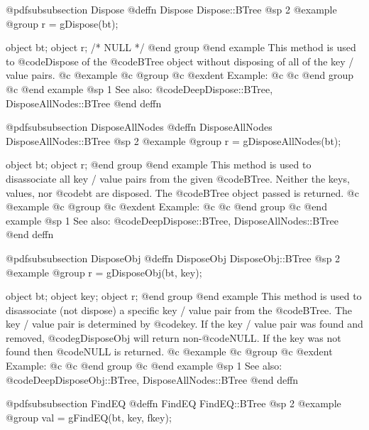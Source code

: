 @pdfsubsubsection {Dispose}
@deffn {Dispose} Dispose::BTree
@sp 2
@example
@group
r = gDispose(bt);

object  bt;
object  r;     /*  NULL  */
@end group
@end example
This method is used to @code{Dispose} of the @code{BTree} object without
disposing of all of the key / value pairs.
@c @example
@c @group
@c @exdent Example:
@c 
@c @end group
@c @end example
@sp 1
See also:  @code{DeepDispose::BTree, DisposeAllNodes::BTree}
@end deffn









@pdfsubsubsection {DisposeAllNodes}
@deffn {DisposeAllNodes} DisposeAllNodes::BTree
@sp 2
@example
@group
r = gDisposeAllNodes(bt);

object  bt;
object  r;
@end group
@end example
This method is used to disassociate all key / value pairs from the given
@code{BTree}.  Neither the keys, values, nor @code{bt} are disposed.  The
@code{BTree} object passed is returned.
@c @example
@c @group
@c @exdent Example:
@c 
@c @end group
@c @end example
@sp 1
See also:  @code{DeepDispose::BTree, DisposeAllNodes::BTree}
@end deffn












@pdfsubsubsection {DisposeObj}
@deffn {DisposeObj} DisposeObj::BTree
@sp 2
@example
@group
r = gDisposeObj(bt, key);

object  bt;
object  key;
object  r;
@end group
@end example
This method is used to disassociate (not dispose) a specific key / value
pair from the @code{BTree}.  The key / value pair is determined by
@code{key}.  If the key / value pair was found and removed,
@code{gDisposeObj} will return non-@code{NULL}.  If the key was not
found then @code{NULL} is returned.
@c @example
@c @group
@c @exdent Example:
@c 
@c @end group
@c @end example
@sp 1
See also:  @code{DeepDisposeObj::BTree, DisposeAllNodes::BTree}
@end deffn



















@pdfsubsubsection {FindEQ}
@deffn {FindEQ} FindEQ::BTree
@sp 2
@example
@group
val = gFindEQ(bt, key, fkey);

